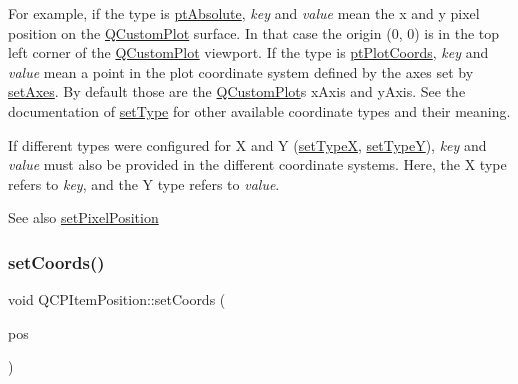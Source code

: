 For example, if the type is \mbox{\hyperlink{class_q_c_p_item_position_aad9936c22bf43e3d358552f6e86dbdc8a564f5e53e550ead1ec5fc7fc7d0b73e0}{pt\+Absolute}}, {\itshape key} and {\itshape value} mean the x and y pixel position on the \mbox{\hyperlink{class_q_custom_plot}{Q\+Custom\+Plot}} surface. In that case the origin (0, 0) is in the top left corner of the \mbox{\hyperlink{class_q_custom_plot}{Q\+Custom\+Plot}} viewport. If the type is \mbox{\hyperlink{class_q_c_p_item_position_aad9936c22bf43e3d358552f6e86dbdc8ad5ffb8dc99ad73263f7010c77342294c}{pt\+Plot\+Coords}}, {\itshape key} and {\itshape value} mean a point in the plot coordinate system defined by the axes set by \mbox{\hyperlink{class_q_c_p_item_position_a2185f45c75ac8cb9be89daeaaad50e37}{set\+Axes}}. By default those are the \mbox{\hyperlink{class_q_custom_plot}{Q\+Custom\+Plot}}\textquotesingle{}s x\+Axis and y\+Axis. See the documentation of \mbox{\hyperlink{class_q_c_p_item_position_aa476abf71ed8fa4c537457ebb1a754ad}{set\+Type}} for other available coordinate types and their meaning.

If different types were configured for X and Y (\mbox{\hyperlink{class_q_c_p_item_position_a2113b2351d6d00457fb3559a4e20c3ea}{set\+TypeX}}, \mbox{\hyperlink{class_q_c_p_item_position_ac2a454aa5a54c1615c50686601ec4510}{set\+TypeY}}), {\itshape key} and {\itshape value} must also be provided in the different coordinate systems. Here, the X type refers to {\itshape key}, and the Y type refers to {\itshape value}.

\begin{DoxySeeAlso}{See also}
\mbox{\hyperlink{class_q_c_p_item_position_a8d4f858f2089973967cf9cb81970ef0a}{set\+Pixel\+Position}} 
\end{DoxySeeAlso}
\mbox{\label{class_q_c_p_item_position_acc70b3abc143287f806e5f154e5e07b0}} 
\subsubsection{\texorpdfstring{setCoords()}{setCoords()}\hspace{0.1cm}{\footnotesize\ttfamily [2/2]}}
{\footnotesize\ttfamily void Q\+C\+P\+Item\+Position\+::set\+Coords (\begin{DoxyParamCaption}\item[{const Q\+PointF \&}]{pos }\end{DoxyParamCaption})}

